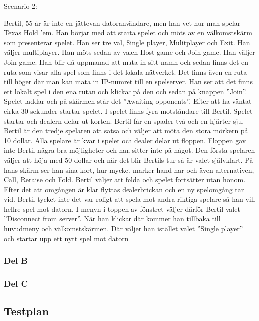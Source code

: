 \documentclass[10pt,a4paper]{article}
\begin{document}
\vspace{1em}
\noindent
Scenario 2:

\vspace{1em}
\noindent
Bertil, 55 år är inte en jättevan datoranvändare, men han vet hur man
spelar Texas Hold ’em. Han börjar med att starta spelet och möts av en
välkomstskärm som presenterar spelet. Han ser tre val, Single player,
Mulitplayer och Exit. Han väljer multiplayer. Han möts sedan av valen Host
game och Join game. Han väljer Join game. Han blir då uppmanad att mata in
sitt namn och sedan finns det en ruta som visar alla spel som finns i det
lokala nätverket. Det finns även en ruta till höger där man kan mata in
IP-numret till en spelserver. Han ser att det finns ett lokalt spel i den
ena rutan och klickar på den och sedan på knappen ”Join”. Spelet laddar och
på skärmen står det ”Awaiting opponents”. Efter att ha väntat cirka 30
sekunder startar spelet. I spelet finns fyra motståndare till Bertil.
Spelet startar och dealern delar ut korten. Bertil får en spader två och en
hjärter sju. Bertil är den tredje spelaren att satsa och väljer att möta
den stora mörkern på 10 dollar. Alla spelare är kvar i spelet och dealer
delar ut floppen. Floppen gav inte Bertil några bra möjligheter och han
sitter inte på något. Den första spelaren väljer att höja med 50 dollar och
när det blir Bertils tur så är valet självklart. På hans skärm ser han sina
kort, hur mycket marker hand har och även alternativen, Call, Reraise och
Fold. Bertil väljer att folda och spelet fortsätter utan honom. Efter det
att omgången är klar flyttas dealerbrickan och en ny spelomgång tar vid.
Bertil tycket inte det var roligt att spela mot andra riktiga spelare så
han vill hellre spel mot datorn. I menyn i toppen av fönstret väljer därför
Bertil valet ”Disconnect from server”. När han klickar där kommer han
tillbaka till huvudmeny och välkomstskärmen. Där väljer han istället valet
”Single player” och startar upp ett nytt spel mot datorn.

\subsubsection*{Del B}

\subsubsection*{Del C}

\subsection*{Testplan}
\end{document}
